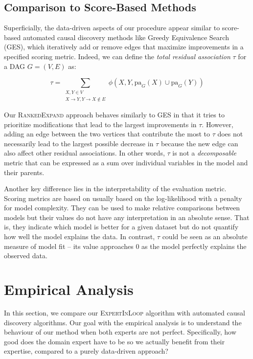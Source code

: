 \documentclass{uai2025} %
\begin{document}
\subsection{Comparison to Score-Based Methods}

Superficially, the data-driven aspects of our procedure appear
 similar to score-based automated causal discovery methods like 
Greedy Equivalence Search (GES), which 
iteratively add or remove edges that maximize improvements in a specified
scoring metric. Indeed, we can define the \emph{total residual association}
 $ \tau $ for a DAG $ G = (V, E) $ as:

\begin{equation}
	\tau = \sum_{\substack{X, Y \in V \\ X \rightarrow Y, Y \rightarrow X \not \in E}}   \phi(X, Y, \mathrm{pa}_G(X) \cup \mathrm{pa}_G(Y))
\label{eqn:tau}
\end{equation}

Our \textsc{RankedExpand} approach behaves similarly to GES in that it 
tries to prioritize modifications that lead to the largest improvements 
in $\tau$. However, adding an edge between the two vertices that contribute
the most to $\tau$ does not necessarily lead to the largest 
possible decrease in $\tau$ because the new edge can also affect other 
residual associations. In other words, $\tau$ is not a \emph{decomposable}
metric that can be expressed as a sum over individual variables in the model
and their parents. 

Another key difference lies in the interpretability of the evaluation metric.
Scoring metrics are based on usually based on the log-likelihood with a penalty
for model complexity. They can be used to make relative comparisons between
models but their values do not have any interpretation in an absolute sense.
That is, they indicate which model is better for a given dataset but do not
quantify how well the model explains the data. In
contrast, $ \tau $ could be seen as an absolute measure of model fit -- 
its value approaches $ 0 $ as the model perfectly explains the observed data.

\section{Empirical Analysis}
\label{sec:empirical}

In this section, we compare our \textsc{ExpertInLoop} algorithm with automated
causal discovery algorithms. Our goal with the empirical analysis is to
understand the behaviour of our method when both experts are not perfect.
Specifically, how good does the domain expert have to be so we actually benefit
from their expertise, compared to a purely data-driven approach? 
\end{document}
